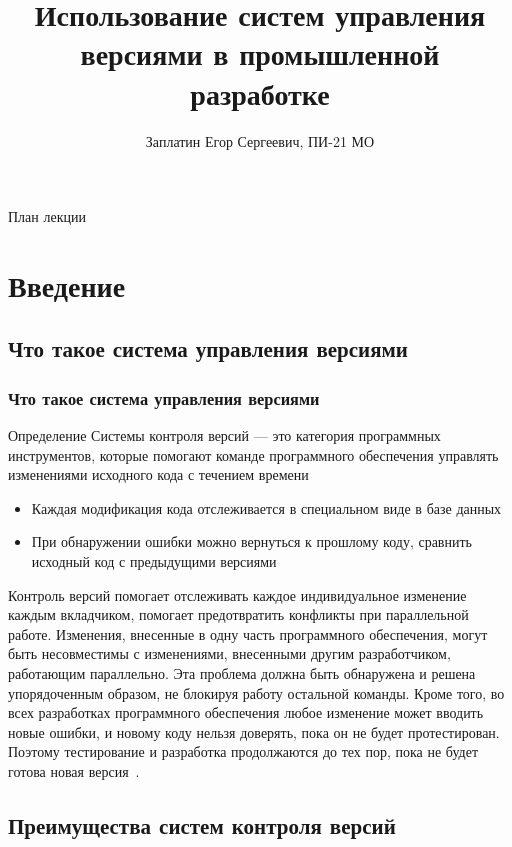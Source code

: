 \documentclass{../industrial-development}
\title{Использование систем управления версиями в промышленной разработке}
\author{Заплатин Егор Сергеевич, ПИ-21 МО}
\date{}
\begin{document}
\begin{frame}
  \titlepage
\end{frame}

\begin{frame}{План лекции}
  \tableofcontents
\end{frame}

\section{Введение}

\subsection{Что такое система управления версиями}

\begin{frame} \frametitle{Что такое система управления версиями}
  \begin{block}{Определение}
    \alert{Системы контроля версий} --- это категория программных инструментов, которые помогают команде программного обеспечения управлять изменениями исходного кода с течением времени
  \end{block}
  
  \begin{itemize}
  \item Каждая модификация кода отслеживается в специальном виде в базе данных
  \item При обнаружении ошибки можно вернуться к прошлому коду, сравнить исходный код с предыдущими версиями
  \end{itemize}
\end{frame}

\lecturenotes

Контроль версий помогает отслеживать каждое индивидуальное изменение каждым вкладчиком, помогает предотвратить конфликты при параллельной работе. Изменения, внесенные в одну часть программного обеспечения, могут быть несовместимы с изменениями, внесенными другим разработчиком, работающим параллельно. Эта проблема должна быть обнаружена и решена упорядоченным образом, не блокируя работу остальной команды. Кроме того, во всех разработках программного обеспечения любое изменение может вводить новые ошибки, и новому коду нельзя доверять, пока он не будет протестирован. Поэтому тестирование и разработка продолжаются до тех пор, пока не будет готова новая версия~\cite{Atlassian}.

\subsection{Преимущества систем контроля версий}
\end{document}

